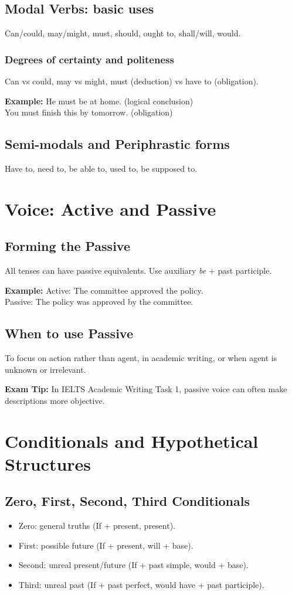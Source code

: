 \documentclass[12pt,oneside]{book}
\newcommand{\ex}[1]{\begin{examplebox}\textbf{Example:} #1\end{examplebox}}
\newcommand{\tip}[1]{\begin{examptip}\textbf{Exam Tip:} #1\end{examptip}}
\begin{document}
\section{Modal Verbs: basic uses}
Can/could, may/might, must, should, ought to, shall/will, would.

\subsection{Degrees of certainty and politeness}
Can vs could, may vs might, must (deduction) vs have to (obligation).

\ex{He must be at home. (logical conclusion) \\ You must finish this by tomorrow. (obligation)}

\section{Semi-modals and Periphrastic forms}
Have to, need to, be able to, used to, be supposed to.

\chapter{Voice: Active and Passive}
\section{Forming the Passive}
All tenses can have passive equivalents. Use auxiliary \textit{be} + past participle.

\ex{Active: The committee approved the policy. \\ Passive: The policy was approved by the committee.}

\section{When to use Passive}
To focus on action rather than agent, in academic writing, or when agent is unknown or irrelevant.

\tip{In IELTS Academic Writing Task 1, passive voice can often make descriptions more objective.}

\chapter{Conditionals and Hypothetical Structures}
\section{Zero, First, Second, Third Conditionals}
\begin{itemize}
  \item Zero: general truths (If + present, present). \
  \item First: possible future (If + present, will + base). \
  \item Second: unreal present/future (If + past simple, would + base). \
  \item Third: unreal past (If + past perfect, would have + past participle). \
\end{itemize}
\end{document}
